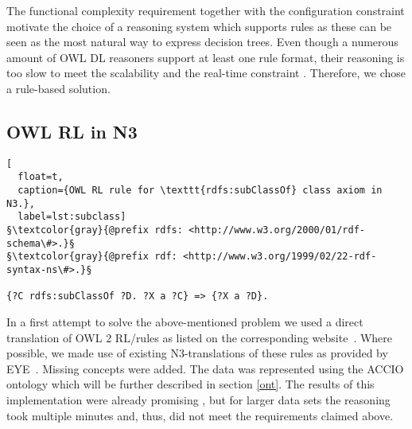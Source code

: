 The functional complexity requirement together with the configuration constraint motivate 
the choice of a reasoning system which supports rules as these can be seen as the most natural way to 
express decision trees. Even though a numerous amount of OWL DL reasoners support at least one rule format, 
their reasoning is too slow to meet the scalability and the real-time constraint \cite{ORCA}. 
Therefore, we chose a rule-based solution. 
 

\subsection{OWL RL in N3}\label{owlrl}

 
 \begin{lstlisting}[
  float=t,
  caption={OWL RL rule for \texttt{rdfs:subClassOf} class axiom in N3.},
  label=lst:subclass]
§\textcolor{gray}{@prefix rdfs: <http://www.w3.org/2000/01/rdf-schema\#>.}§
§\textcolor{gray}{@prefix rdf: <http://www.w3.org/1999/02/22-rdf-syntax-ns\#>.}§

{?C rdfs:subClassOf ?D. ?X a ?C} => {?X a ?D}.
\end{lstlisting}
In a first attempt to solve the above-mentioned problem we used a direct translation of OWL 2 RL/\rdf rules as listed on the corresponding website~\cite{OWLRL}. 
Where possible, we made use of existing N3-translations of these rules as provided by EYE~\cite{EYEowl}. Missing concepts were added. 
The data was represented using the ACCIO ontology \cite{accioont} which will be further described in section \ref{ont}.
The results of this 
implementation were already promising \cite{arndt_ruleml_2015}, but for larger data sets the reasoning took multiple minutes and, thus, did not meet the requirements claimed above. 

